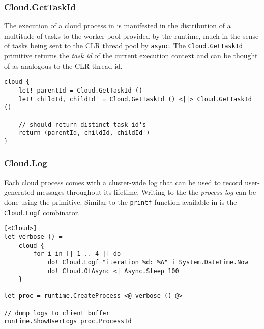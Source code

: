 \subsubsection*{Cloud.GetTaskId}

The execution of a cloud process in \mbrace{} is manifested in the distribution of
a multitude of tasks to the worker pool provided by the runtime, much in the
sense of tasks being sent to the CLR thread pool by \texttt{async}.
The \texttt{Cloud.GetTaskId} primitive returns the \emph{task id} of the current
execution context and can be thought of as analogous to the CLR thread id.
\begin{lstlisting}
cloud {
	let! parentId = Cloud.GetTaskId ()
	let! childId, childId' = Cloud.GetTaskId () <||> Cloud.GetTaskId ()
	
	// should return distinct task id's
	return (parentId, childId, childId')
}
\end{lstlisting}

\subsubsection*{Cloud.Log}

Each cloud process comes with a cluster-wide log that can be used to record
user-generated messages throughout its lifetime. Writing to the
the \emph{process log} can be done using the
primitive. Similar to the \texttt{printf} function available in \fsharp{} 
is the \texttt{Cloud.Logf} combinator.
\begin{lstlisting}
[<Cloud>]
let verbose () =
    cloud {
        for i in [| 1 .. 4 |] do
            do! Cloud.Logf "iteration %d: %A" i System.DateTime.Now
            do! Cloud.OfAsync <| Async.Sleep 100
    }

let proc = runtime.CreateProcess <@ verbose () @>

// dump logs to client buffer
runtime.ShowUserLogs proc.ProcessId
\end{lstlisting}

